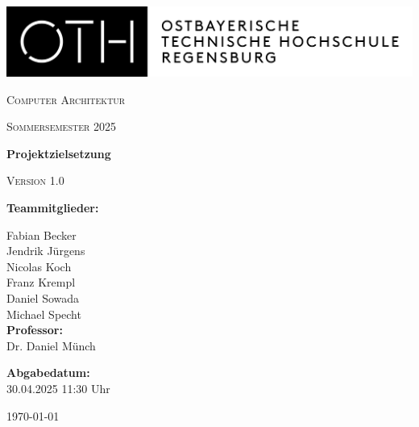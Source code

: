 \begin{titlepage}
    \begin{flushleft}
        \includegraphics[width=.6\textwidth]{./images/oth.png}
    \end{flushleft}

    \vspace*{2cm}

    \centering
    {\scshape\Large Computer Architektur \par}
    \vspace{0.5cm}
    {\scshape Sommersemester 2025 \par}
    \vspace{0.5cm}
    {\huge\bfseries Projektzielsetzung \par}
    \vspace{0.5cm}
    {\scshape Version 1.0 \par}
    \vspace{2cm}

    \begin{flushleft}
        \large
        \textbf{Teammitglieder:} \\
        \vspace{0.5cm}

        Fabian Becker\hfill\makebox[8cm]{\hrulefill} \\[0.5cm]
        Jendrik Jürgens\hfill\makebox[8cm]{\hrulefill} \\[0.5cm]
        Nicolas Koch\hfill\makebox[8cm]{\hrulefill} \\[0.5cm]
        Franz Krempl\hfill\makebox[8cm]{\hrulefill} \\[0.5cm]
        Daniel Sowada\hfill\makebox[8cm]{\hrulefill} \\[0.5cm]
        Michael Specht\hfill\makebox[8cm]{\hrulefill} \\[1cm]

        \textbf{Professor:} \\
        Dr. Daniel Münch \\
        \vspace{0.5cm}

        \textbf{Abgabedatum:} \\
        30.04.2025 11:30 Uhr \\
    \end{flushleft}

    \vfill
    \centering
    {\large \today\par}
\end{titlepage}
